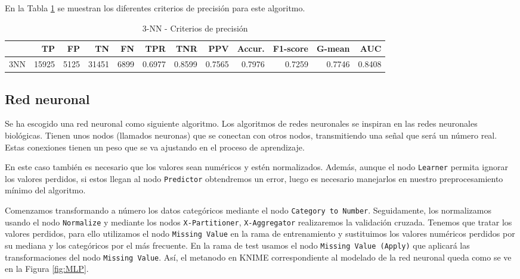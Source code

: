 \documentclass[a4paper, 20pt]{article}
\begin{document}

En la Tabla \ref{tab:3nn} se muestran los diferentes criterios de precisión para este algoritmo.

\begin{table}[H]
\centering
\caption{3-NN - Criterios de precisión}
\label{tab:3nn}
\begin{tabular}{lrrrrrrrrrrr}
\toprule
 & TP & FP & TN & FN & TPR & TNR & PPV & Accur. & F1-score & G-mean & AUC\\ \midrule
3NN & 15925 & 5125 & 31451 & 6899 & 0.6977 & 0.8599 & 0.7565 & 0.7976 & 0.7259 & 0.7746 & 0.8408\\
\bottomrule
\end{tabular}
\end{table}
\subsection{Red neuronal}

Se ha escogido una red neuronal como siguiente algoritmo. Los algoritmos de redes neuronales se inspiran en las redes neuronales biológicas. Tienen unos nodos (llamados neuronas) que se conectan con otros nodos, transmitiendo una señal que será un número real. Estas conexiones tienen un peso que se va ajustando en el proceso de aprendizaje.  

En este caso también es necesario que los valores sean numéricos y estén normalizados. Además, aunque el nodo \texttt{Learner} permita ignorar los valores perdidos, si estos llegan al nodo \texttt{Predictor} obtendremos un error, luego es necesario manejarlos en nuestro preprocesamiento mínimo del algoritmo.

Comenzamos transformando a número los datos categóricos mediante el nodo \texttt{Category to Number}. Seguidamente, los normalizamos usando el nodo \texttt{Normalize} y mediante los nodos \texttt{X-Partitioner}, \texttt{X-Aggregator} realizaremos la validación cruzada. Tenemos que tratar los valores perdidos, para ello utilizamos el nodo \texttt{Missing Value} en la rama de entrenamiento y sustituimos los valores numéricos perdidos por su mediana y los categóricos por el más frecuente. En la rama de test usamos el nodo \texttt{Missing Value (Apply)} que aplicará las transformaciones del nodo \texttt{Missing Value}. Así, el metanodo en KNIME correspondiente al modelado de la red neuronal queda como se ve en la Figura \ref{fig:MLP}. 
\end{document}
